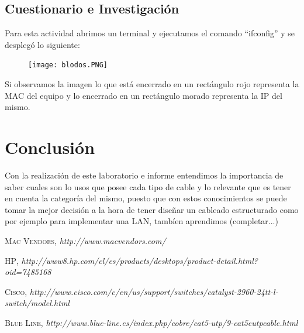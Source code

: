\documentclass{udpreport}
\begin{document}
	\section{Cuestionario e Investigación}
		Para esta actividad abrimos un terminal y ejecutamos el comando ``ifconfig'' y se desplegó lo siguiente:\\
		\begin{figure}[h]
    		\centering
    	\texttt{[image: blodos.PNG]}
		\end{figure}
		Si observamos la imagen lo que está encerrado en un rectángulo rojo representa la MAC del equipo y lo encerrado en un
		rectángulo morado representa la IP del mismo.
\chapter{Conclusión}
    Con la realización de este laboratorio e informe entendimos la importancia de saber cuales son lo usos que posee cada tipo de cable y lo relevante que es tener en cuenta la categoría del mismo, puesto que con estos conocimientos se puede tomar la mejor decisión a la hora de tener diseñar un cableado estructurado como por ejemplo para implementar una LAN, tambíen aprendimos (completar...)
\begin{thebibliography}{x}

 \textsc{Mac Vendors},
\textit{http://www.macvendors.com/}

 \textsc{HP},
\textit{http://www8.hp.com/cl/es/products/desktops/product-detail.html?oid=7485168}

 \textsc{Cisco},
\textit{http://www.cisco.com/c/en/us/support/switches/catalyst-2960-24tt-l-switch/model.html}

 \textsc{Blue Line},
\textit{http://www.blue-line.es/index.php/cobre/cat5-utp/9-cat5eutpcable.html}

\end{thebibliography}
\end{document}
